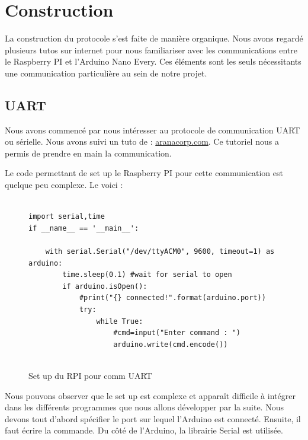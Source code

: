 \documentclass[
	a4paper,									%
	11pt,										%
	twoside,									%
	openright,									%
	notitlepage,									%
	parskip=half,								%
]{scrreprt}										%
\begin{document}
\chapter{Construction}

La construction du protocole s'est faite de manière organique. Nous avons regardé plusieurs tutos sur internet 
pour nous familiariser avec les communications entre le Raspberry PI et l'Arduino Nano Every. Ces éléments sont les 
seuls nécessitants une communication particulière au sein de notre projet. 

\section{UART}

Nous avons commencé par nous intéresser au protocole de communication UART ou sérielle. Nous avons suivi un tuto
de : \href{https://www.aranacorp.com/fr/communication-serie-entre-raspberry-pi-et-arduino/}{aranacorp.com}. Ce tutoriel
nous a permis de prendre en main la communication. \par

Le code permettant de set up le Raspberry PI pour cette communication est quelque peu complexe. Le voici : 

\begin{figure}[!ht]
	
	\begin{verbatim}

import serial,time
if __name__ == '__main__':
    
    with serial.Serial("/dev/ttyACM0", 9600, timeout=1) as arduino:
        time.sleep(0.1) #wait for serial to open
        if arduino.isOpen():
            #print("{} connected!".format(arduino.port))
            try:
                while True:
                    #cmd=input("Enter command : ")
                    arduino.write(cmd.encode())


	\end{verbatim}
	\caption{Set up du RPI pour comm UART}
	\label{UARTcomm}
	\end{figure}

Nous pouvons observer que le set up est complexe et apparaît difficile à intégrer dans les différents programmes
que nous allons développer par la suite. Nous devons tout d'abord spécifier le port sur lequel l'Arduino est connecté. 
Ensuite, il faut écrire la commande. Du côté de l'Arduino, la librairie Serial est utilisée. \par
\end{document}
